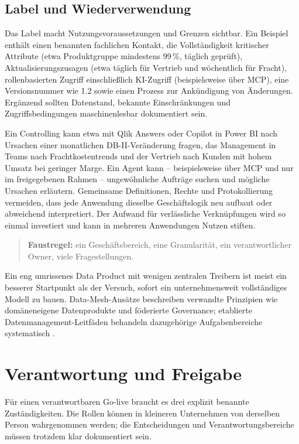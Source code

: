 \documentclass[a4paper,12pt,twoside]{report}
\theoremstyle{definition}
\begin{document}
\section{Label und Wiederverwendung}
Das Label macht Nutzungsvoraussetzungen und Grenzen sichtbar. Ein Beispiel enthält einen benannten fachlichen Kontakt, die Vollständigkeit kritischer Attribute (etwa Produktgruppe mindestens 99\,\%, täglich geprüft), Aktualisierungszusagen (etwa täglich für Vertrieb und wöchentlich für Fracht), rollenbasierten Zugriff einschließlich KI-Zugriff (beispielsweise über MCP), eine Versionsnummer wie 1.2 sowie einen Prozess zur Ankündigung von Änderungen. Ergänzend sollten Datenstand, bekannte Einschränkungen und Zugriffsbedingungen maschinenlesbar dokumentiert sein.

Ein  Controlling kann etwa mit Qlik Answers oder Copilot in Power BI nach Ursachen einer monatlichen DB-II-Veränderung fragen, das Management in Teams nach Frachtkostentrends und der Vertrieb nach Kunden mit hohem Umsatz bei geringer Marge. Ein Agent kann – beispielsweise über MCP und nur im freigegebenen Rahmen – ungewöhnliche Aufträge suchen und mögliche Ursachen erläutern. Gemeinsame Definitionen, Rechte und Protokollierung vermeiden, dass jede Anwendung dieselbe Geschäftslogik neu aufbaut oder abweichend interpretiert. Der Aufwand für verlässliche Verknüpfungen wird so einmal investiert und kann in mehreren Anwendungen Nutzen stiften.

\begin{quote}
\textbf{Faustregel:} ein Geschäftsbereich, eine Granularität, ein verantwortlicher Owner, viele Fragestellungen.
\end{quote}
Ein eng umrissenes Data Product mit wenigen zentralen Treibern ist meist ein besserer Startpunkt als der Versuch, sofort ein unternehmensweit vollständiges Modell zu bauen. Data-Mesh-Ansätze beschreiben verwandte Prinzipien wie domäneneigene Datenprodukte und föderierte Governance; etablierte Datenmanagement-Leitfäden behandeln dazugehörige Aufgabenbereiche systematisch \cite{dehghani22,dama17}.

\chapter{Verantwortung und Freigabe}
\label{sec:practice}

Für einen verantwortbaren Go-live braucht es drei explizit benannte Zuständigkeiten. Die Rollen können in kleineren Unternehmen von derselben Person wahrgenommen werden; die Entscheidungen und Verantwortungsbereiche müssen trotzdem klar dokumentiert sein.
\end{document}
